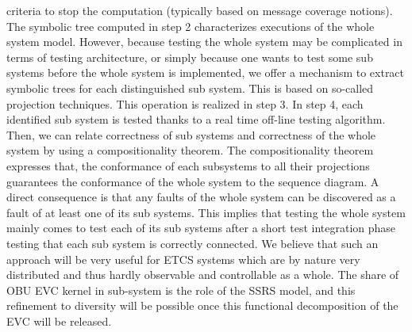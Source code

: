 \documentclass{template/openetcs_report}
\begin{document}
criteria to stop the computation (typically based on message coverage notions). 
The symbolic tree computed in step 2 characterizes executions of the whole system model. 
However, because testing the whole system may be complicated in terms of testing architecture, 
or simply because one wants to test some sub systems before the whole system is implemented, 
we offer a mechanism to extract symbolic trees for each distinguished sub system. This is based 
on so-called projection techniques. This operation is realized in step 3. In step 4, each identified 
sub system is tested thanks to a real time off-line testing algorithm.
Then, we can relate correctness of sub systems and correctness of the whole system by using a 
compositionality theorem.
The compositionality theorem expresses that, the conformance of each subsystems to all their 
projections guarantees the conformance of the whole system to the sequence diagram. A direct
 consequence is that any faults of the whole system can be discovered as a fault of at least one
 of its sub systems. This implies that testing the whole system mainly comes to test each of its 
sub systems after a short test integration phase testing that each sub system is correctly connected.
 We believe that such an approach will be very useful for ETCS systems which are by nature very 
distributed and thus hardly observable and controllable as a whole. The share of OBU EVC kernel
 in sub-system is the role of the SSRS model, and this refinement to diversity will be possible once
 this functional decomposition of the EVC will be released.
\end{document}
